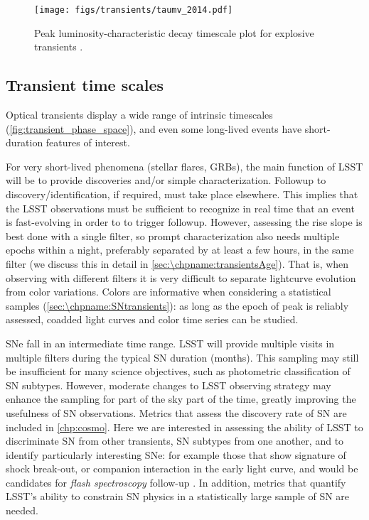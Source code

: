\begin{figure}[hbt]
\centerline{
\texttt{[image: figs/transients/taumv\_2014.pdf]}
}
\caption{
Peak luminosity-characteristic decay timescale plot for explosive
transients \citep[adapted from][]{2011PhDT........35K}.
}
\label{fig:transient_phase_space}
\end{figure}





%




\subsection{Transient time scales}

Optical transients display a wide range of intrinsic timescales
(\autoref{fig:transient_phase_space}), and even some long-lived events
have short-duration features of interest.

For very short-lived phenomena (stellar flares, GRBs),
the main function of LSST will be to provide discoveries and/or simple
characterization.  Followup to discovery/identification, if required,
must take place elsewhere. This implies that the LSST observations
must be sufficient to recognize in real time that an event is fast-evolving
in order to to trigger followup. However, assessing the rise
slope is best done with a single filter, so prompt characterization
also needs multiple epochs within a night, preferably separated by at
least a few hours, in the same filter (we discuss this in detail in
\autoref{sec:\chpname:transientsAge}). That is, when observing with different
filters it is very difficult to separate lightcurve evolution from
color variations. Colors are informative when considering a statistical
samples (\autoref{sec:\chpname:SNtransients}): as long as the epoch of peak is
reliably assessed, coadded light curves and color time series can be studied.

SNe fall in an intermediate time range.  LSST will provide
multiple visits in multiple filters during the typical SN duration
(months).  This sampling may still be insufficient for many science
objectives, such as photometric classification of SN subtypes.
However, moderate changes to LSST
observing strategy may enhance the sampling for part of the sky part
of the time, greatly improving the usefulness of SN observations.
Metrics that assess the discovery rate of SN are included in
\autoref{chp:cosmo}.
Here we are interested in assessing the ability of
LSST to discriminate SN from other transients, SN subtypes from one
another, and to identify particularly interesting SNe: for example
those that show signature of shock break-out, or companion interaction
in the early light curve, and would be candidates for \emph{flash
spectroscopy} follow-up \citep[e.g.,][]{2014Natur.509..471G}.
In addition, metrics that
quantify LSST's ability to constrain SN physics in a statistically
large sample of SN are needed.

